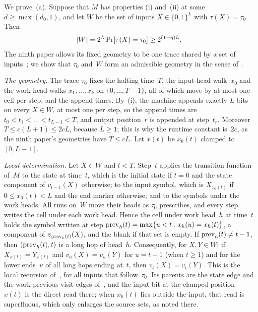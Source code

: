 \begin{outline}
We prove~(a). Suppose that $M$ has properties (i) and~(ii) at some $d\ge\max(d_0,1)$, and let $W$ be the set of inputs
$X\in\{0,1\}^L$ with $\tau(X)=\tau_0$. Then
\begin{equation}\label{eq:LA-fibre}
 \lvert W \rvert=2^L\Pr[\tau(X)=\tau_0]\ge2^{(1-\eta)L}.
\end{equation}
The ninth paper allows its fixed geometry to be one trace shared by a set of inputs~\cite[Section~2.1]{SourceCovers2026};
we show that $\tau_0$ and~$W$ form an admissible geometry in the sense of~\cite[Definition~2.2]{SourceCovers2026}.

\emph{The geometry.} The trace $\tau_0$ fixes the halting time~$T$, the input-head walk~$x_0$ and the work-head walks
$x_1,\dots,x_k$ on $\{0,\dots,T-1\}$, all of which move by at most one cell per step, and the append times. By~(i), the
machine appends exactly $L$ bits on every $X\in W$, at most one per step, so the append times are
$t_0<t_1<\dots<t_{L-1}<T$, and output position~$r$ is appended at step~$t_r$. Moreover $T\le c(L+1)\le2cL$, because
$L\ge1$; this is why the runtime constant is~$2c$, as the ninth paper's geometries have $T\le cL$. Let $x(t)$ be $x_0(t)$
clamped to $[0,L-1]$.

\emph{Local determination.} Let $X\in W$ and $t<T$. Step~$t$ applies the transition function of~$M$ to the state at
time~$t$, which is the initial state if $t=0$ and the state component of $v_{t-1}(X)$ otherwise; to the input symbol,
which is $X_{x_0(t)}$ if $0\le x_0(t)<L$ and the end marker otherwise; and to the symbols under the work heads. All runs
on~$W$ move their heads as $\tau_0$ prescribes, and every step writes the cell under each work head. Hence the cell under
work head~$h$ at time~$t$ holds the symbol written at step $\mathrm{prev}_h(t)=\max\{u<t:x_h(u)=x_h(t)\}$, a component of
$v_{\mathrm{prev}_h(t)}(X)$, and the blank if that set is empty. If $\mathrm{prev}_h(t)\ne t-1$, then $(\mathrm{prev}_h(t),t)$ is a long hop of
head~$h$. Consequently, for $X,Y\in W$: if $X_{x(t)}=Y_{x(t)}$ and $v_u(X)=v_u(Y)$ for $u=t-1$ (when $t\ge1$) and for the
lower ends~$u$ of all long hops ending at~$t$, then $v_t(X)=v_t(Y)$. This is the local recursion
of~\cite[Lemma~4.2]{FourthPaper2026}, for all inputs that follow~$\tau_0$. Its parents are the state edge and the work
previous-visit edges of~\cite[Section~2.1]{SourceCovers2026}, and the input bit at the clamped position $x(t)$ is the
direct read there; when $x_0(t)$ lies outside the input, that read is superfluous, which only enlarges the source sets,
as noted there.


\end{outline}
